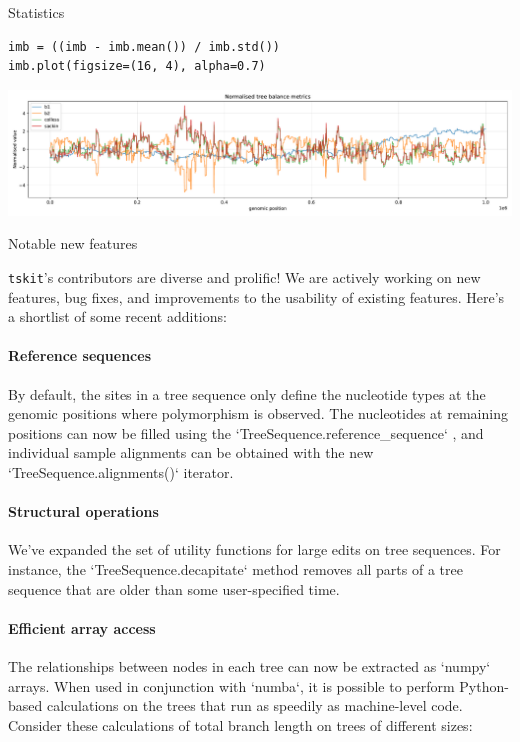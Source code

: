 \documentclass[landscape,a0paper,fontscale=0.4]{baposter}
\newcommand{\tskit}{{\texttt{tskit}}}
\begin{document}
\begin{poster}
\begin{posterbox}[name=stats,column=3,row=0,span=1]{Statistics}
\begin{verbatim}
imb = ((imb - imb.mean()) / imb.std())
imb.plot(figsize=(16, 4), alpha=0.7)
\end{verbatim}
\includegraphics[width=\textwidth]{tree_balance}

\end{posterbox}


\begin{posterbox}[name=operations,column=3,below=stats,span=1]{Notable new features}

\tskit{}'s contributors are diverse and prolific! We are actively working on new features, bug fixes, and improvements to the usability of existing features. Here's a shortlist of some recent additions:

\paragraph{Reference sequences}
By default, the sites in a tree sequence only define the nucleotide types at
    the genomic positions where polymorphism is observed. The nucleotides at
    remaining positions can now be filled using the
    `TreeSequence.reference\_sequence` , and individual sample alignments can
    be obtained with the new `TreeSequence.alignments()` iterator.

\paragraph{Structural operations}
We've expanded the set of utility functions for large edits on tree sequences.
    For instance, the `TreeSequence.decapitate` method removes all parts of a
    tree sequence that are older than some user-specified time.

\paragraph{Efficient array access }
The relationships between nodes in each tree can now be extracted as `numpy`
    arrays. When used in conjunction with `numba`, it is possible to perform
    Python-based calculations on the trees that run as speedily as
    machine-level code. Consider these calculations of total branch length on
    trees of different sizes:


\end{posterbox}
\end{poster}
\end{document}
